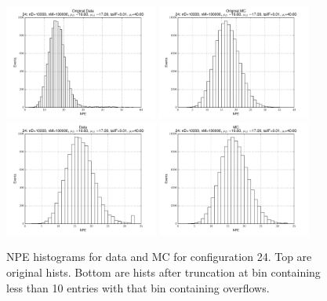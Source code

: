  \begin{figure}[htbp] \begin{center} 
\includegraphics[width=0.45\textwidth]{../FIGURES/24/FIG_Original_Data.pdf} 
\includegraphics[width=0.45\textwidth]{../FIGURES/24/FIG_Original_MC.pdf} 
\includegraphics[width=0.45\textwidth]{../FIGURES/24/FIG_Data.pdf} 
\includegraphics[width=0.45\textwidth]{../FIGURES/24/FIG_MC.pdf} 
\caption{NPE histograms for data and MC for configuration 24. Top are original hists. Bottom are hists after truncation at bin containing less than 10 entries with that bin containing overflows.} 
\label{tab:npe_24} 
\end{center} \end{figure} 

 